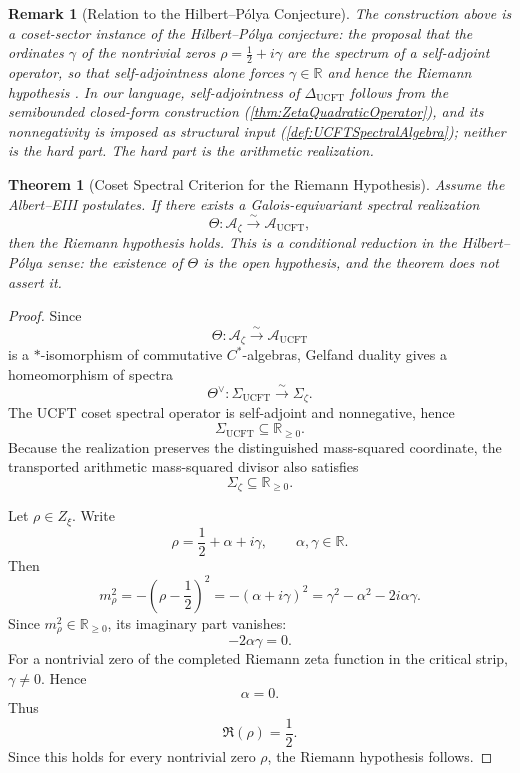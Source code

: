 \documentclass[pdflatex,sn-mathphys-num]{sn-jnl}
\theoremstyle{thmstyleone}
\newtheorem{theorem}{Theorem}
\theoremstyle{thmstylethree}%
\theoremstyle{thmstyletwo}%
\newtheorem{remark}[remark]{Remark}
\begin{document}
\begin{remark}[Relation to the Hilbert--P\'olya Conjecture]
\label{rmk:HilbertPolya}
The construction above is a coset-sector instance of the Hilbert--P\'olya
conjecture: the proposal that the ordinates \(\gamma\) of the nontrivial
zeros \(\rho=\frac12+i\gamma\) are the spectrum of a self-adjoint operator,
so that self-adjointness alone forces \(\gamma\in\mathbb R\) and hence the
Riemann hypothesis \cite{BerryKeatingSIAM1999,Connes1999}. In our language,
self-adjointness of \(\Delta_{\mathrm{UCFT}}\) follows from the semibounded
closed-form construction (\autoref{thm:ZetaQuadraticOperator}), and its
nonnegativity is imposed as structural input
(\autoref{def:UCFTSpectralAlgebra}); neither is the hard part. The hard part is
the arithmetic realization.
\end{remark}

\begin{theorem}[Coset Spectral Criterion for the Riemann Hypothesis]
\label{thm:CosetSpectralCriterion}
Assume the Albert--EIII postulates. If there exists a Galois-equivariant spectral realization
\[
\Theta:\mathcal A_{\zeta}\xrightarrow{\sim}\mathcal A_{\mathrm{UCFT}},
\]
then the Riemann hypothesis holds. This is a conditional reduction in the
Hilbert--P\'olya sense: the existence of \(\Theta\) is the open hypothesis,
and the theorem does not assert it.
\end{theorem}

\begin{proof}
Since
\[
\Theta:\mathcal A_{\zeta}\xrightarrow{\sim}\mathcal A_{\mathrm{UCFT}}
\]
is a \(*\)-isomorphism of commutative \(C^{*}\)-algebras, Gelfand duality gives
a homeomorphism of spectra
\[
\Theta^{\vee}:\Sigma_{\mathrm{UCFT}}\xrightarrow{\sim}\Sigma_{\zeta}.
\]
The UCFT coset spectral operator is self-adjoint and nonnegative, hence
\[
\Sigma_{\mathrm{UCFT}}\subseteq\mathbb R_{\ge0}.
\]
Because the realization preserves the distinguished mass-squared coordinate,
the transported arithmetic mass-squared divisor also satisfies
\[
\Sigma_{\zeta}\subseteq\mathbb R_{\ge0}.
\]

Let \(\rho\in Z_{\xi}\). Write
\[
\rho=\frac12+\alpha+i\gamma,
\qquad
\alpha,\gamma\in\mathbb R.
\]
Then
\[
m_{\rho}^{2}
=
-\left(\rho-\frac12\right)^{2}
=
-(\alpha+i\gamma)^{2}
=
\gamma^{2}-\alpha^{2}-2i\alpha\gamma.
\]
Since \(m_{\rho}^{2}\in\mathbb R_{\ge0}\), its imaginary part vanishes:
\[
-2\alpha\gamma=0.
\]
For a nontrivial zero of the completed Riemann zeta function in the critical
strip, \(\gamma\neq0\). Hence
\[
\alpha=0.
\]
Thus
\[
\Re(\rho)=\frac12.
\]
Since this holds for every nontrivial zero \(\rho\), the Riemann hypothesis
follows.
\end{proof}
\end{document}
